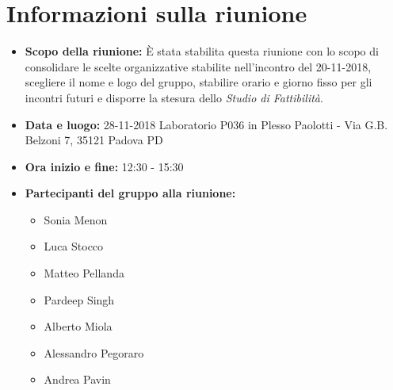\clearpage
\section{Informazioni sulla riunione}
\begin{itemize}
	\item \textbf {Scopo della riunione:} È stata stabilita questa riunione con lo scopo di consolidare le scelte organizzative stabilite nell'incontro del 20-11-2018, scegliere il nome e logo del gruppo, stabilire orario e giorno fisso per gli incontri futuri e disporre la stesura dello \emph{Studio di Fattibilità}.  
	
	\item \textbf {Data e luogo:} 28-11-2018 Laboratorio P036 in Plesso Paolotti - Via G.B. Belzoni 7, 35121 Padova PD
	
	\item \textbf {Ora inizio e fine:} 12:30 - 15:30
	
	\item \textbf {Partecipanti del gruppo alla riunione:} 
		 \begin{itemize}
			\item Sonia Menon
			\item Luca Stocco
			\item Matteo Pellanda
			\item Pardeep Singh
			\item Alberto Miola
			\item Alessandro Pegoraro
			\item Andrea Pavin
		\end{itemize}
\end{itemize}